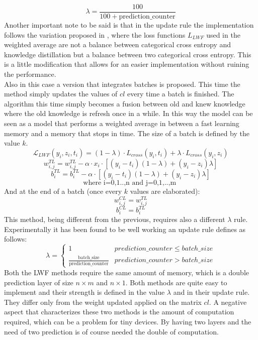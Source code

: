 \documentclass[12pt]{report}
\begin{document}
\[ \lambda = \frac{100}{100+ \text{prediction$\_$counter}} \]
Another important note to be said is that in the update rule the implementation follows the variation proposed in \autocite{maltoni2019continuous}, where the loss functions ${L}_{LWF}$ used in the weighted average are not a balance between categorical cross entropy and knowledge distillation but a balance between two categorical cross entropy. This is a little modification that allows for an easier implementation without ruining the performance. \\
Also in this case a version that integrates batches is proposed. This time the method simply updates the values of $cl$ every time a batch is finished. The  algorithm this time simply becomes a fusion between old and knew knowledge where the old knowledge is refresh once in a while. In this way the model can be seen as a model that performs a weighted average in between a fast learning memory and a memory that stops in time. The size of a batch is defined by the value $k$. 
%
\[    \mathcal{L}_{LWF} ( y_i, z_i, t_i) =  (1-\lambda) \cdot{L}_{cross}(y_i, t_i) + \lambda \cdot{L}_{cross}(y_i, z_i) \]
\[ w^{TL}_{i,j} = w^{TL}_{i,j} - \alpha \cdot x_i \cdot [ (y_i - t_i)(1-\lambda) + (y_i - z_i)\lambda]  \]
\[ b^{TL}_i = b^{TL}_i - \alpha \cdot [ (y_i - t_i)(1-\lambda) + (y_i - z_i)\lambda] \]
\[ \text{where i=0,1..,n  and  j=0,1,..,m } \]
%
And at the end of a batch (once every $k$ values are elaborated):
\[ w^{CL}_{i,j} = w^{TL}_{i,j}  \]
\[ b^{CL}_i = b^{TL}_i  \]
This method, being different from the previous, requires also a different $\lambda$ rule. Experimentally it has been found to be well working an update rule defines as follows:
\begin{equation}
\lambda = \left\{
        		\begin{array}{ll}
            		1                                                         & prediction \_ counter \leq batch \_ size \\
            		\frac{\text{batch$\_$size}}{\text{prediction$\_$counter}} & prediction \_ counter >    batch \_ size
        		\end{array}
    		  \right.
\end{equation}
Both the LWF methods require the same amount of memory, which is a double prediction layer of size  $n \times m$ and $n \times 1$. Both methods are quite easy to implement and their strength is defined in the value $\lambda$ and in their update rule. They differ only from the weight updated applied on the matrix $cl$. A negative aspect that characterizes these two methods is the amount of computation required, which can be a problem for tiny devices. By having two layers and the need of two prediction is of course needed the double of computation. 
\end{document}
